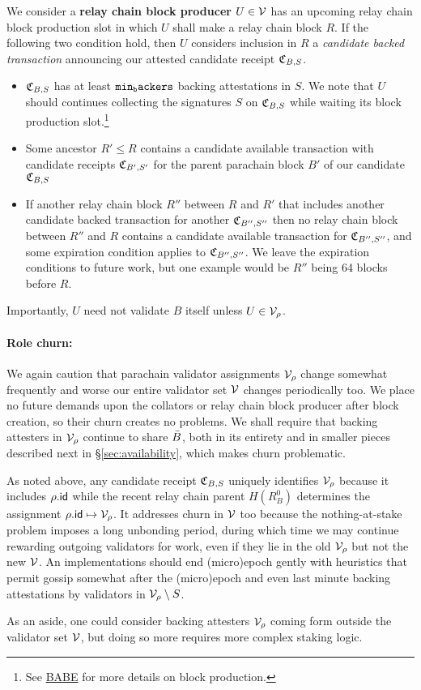 We consider a {\bf relay chain block producer} $U \in \mathcal{V}$ has an upcoming relay chain block production slot in which $U$ shall make a relay chain block $R$.  If the following two condition hold, then $U$ considers inclusion in $R$ a {\em candidate backed transaction} announcing our attested candidate receipt $\mathfrak{C}_{B,S}$.
\begin{itemize}
%
\item $\mathfrak{C}_{B,S}$ has at least $\mathtt{min_backers}$ backing attestations in $S$.  We note that $U$ should continues collecting the signatures $S$ on $\mathfrak{C}_{B,S}$ while waiting its block production slot.\footnote{See \href{http://research.web3.foundation/en/latest/polkadot/BABE/Babe/}{BABE} for more details on block production.}
%
\item Some ancestor $R' \le R$ contains a candidate available transaction with candidate receipts $\mathfrak{C}_{B',S'}$ for the parent parachain block $B'$ of our candidate $\mathfrak{C}_{B,S}$
%
\item If another relay chain block $R''$ between $R$ and $R'$ that includes another candidate backed transaction for another $\mathfrak{C}_{B'',S''}$ then no relay chain block between $R''$ and $R$ contains a candidate available transaction for $\mathfrak{C}_{B'',S''}$, and some expiration condition applies to $\mathfrak{C}_{B'',S''}$.  
We leave the expiration conditions to future work, but one example would be $R''$ being 64 blocks before $R$.
%
\end{itemize}
Importantly, $U$ need not validate $B$ itself unless $U \in \mathcal{V}_{\rho}$.


\smallskip
\paragraph{Role churn:}

We again caution that parachain validator assignments $\mathcal{V}_\rho$ change somewhat frequently and worse our entire validator set $\mathcal{V}$ changes periodically too.  We place no future demands upon the collators or relay chain block producer after block creation, so their churn creates no problems.  We shall require that backing attesters in $\mathcal{V}_\rho$ continue to share $\bar{B}$, both in its entirety and in smaller pieces described next in \S\ref{sec:availability}, which makes churn problematic.  

As noted above, any candidate receipt $\mathfrak{C}_{B,S}$ uniquely identifies $\mathcal{V}_{\rho}$ because it includes $\rho.\mathsf{id}$ while the recent relay chain parent $H(R^0_B)$ determines the assignment $\rho.\mathsf{id} \mapsto \mathcal{V}_{\rho}$.
It addresses churn in $\mathcal{V}$ too because the nothing-at-stake problem imposes a long unbonding period, during which time we may continue rewarding outgoing validators for work, even if they lie in the old $\mathcal{V}_{\rho}$ but not the new $\mathcal{V}$.   
An implementations should end (micro)epoch gently with heuristics that permit gossip somewhat after the (micro)epoch and even last minute backing attestations by validators in $\mathcal{V}_{\rho} \setminus S$.

As an aside, one could consider backing attesters $\mathcal{V}_{\rho}$ coming form outside the validator set $\mathcal{V}$, but doing so more requires more complex staking logic. 

